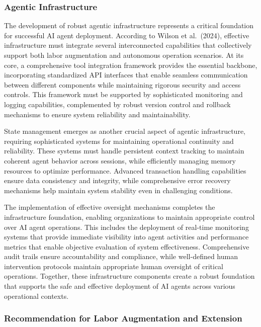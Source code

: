 \documentclass[
]{article}
\begin{document}
\subsubsection{Agentic Infrastructure}\label{agentic-infrastructure}

The development of robust agentic infrastructure represents a critical
foundation for successful AI agent deployment. According to Wilson et
al.~(2024), effective infrastructure must integrate several
interconnected capabilities that collectively support both labor
augmentation and autonomous operation scenarios. At its core, a
comprehensive tool integration framework provides the essential
backbone, incorporating standardized API interfaces that enable seamless
communication between different components while maintaining rigorous
security and access controls. This framework must be supported by
sophisticated monitoring and logging capabilities, complemented by
robust version control and rollback mechanisms to ensure system
reliability and maintainability.

State management emerges as another crucial aspect of agentic
infrastructure, requiring sophisticated systems for maintaining
operational continuity and reliability. These systems must handle
persistent context tracking to maintain coherent agent behavior across
sessions, while efficiently managing memory resources to optimize
performance. Advanced transaction handling capabilities ensure data
consistency and integrity, while comprehensive error recovery mechanisms
help maintain system stability even in challenging conditions.

The implementation of effective oversight mechanisms completes the
infrastructure foundation, enabling organizations to maintain
appropriate control over AI agent operations. This includes the
deployment of real-time monitoring systems that provide immediate
visibility into agent activities and performance metrics that enable
objective evaluation of system effectiveness. Comprehensive audit trails
ensure accountability and compliance, while well-defined human
intervention protocols maintain appropriate human oversight of critical
operations. Together, these infrastructure components create a robust
foundation that supports the safe and effective deployment of AI agents
across various operational contexts.

\subsubsection{Recommendation for Labor Augmentation and
Extension}\label{recommendation-for-labor-augmentation-and-extension}
\end{document}
